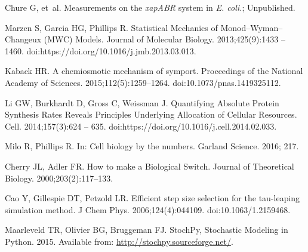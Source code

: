 \documentclass[10pt,letterpaper]{article}
\begin{document}
\begin{thebibliography}{10}
	Chure G, et~al.
	\newblock Measurements on the \emph{xapABR} system in \emph{E. coli.};
	Unpublished.
	
	Marzen S, Garcia HG, Phillips R.
	\newblock Statistical Mechanics of Monod--Wyman--Changeux (MWC) Models.
	\newblock Journal of Molecular Biology. 2013;425(9):1433 -- 1460.
	\newblock doi:{https://doi.org/10.1016/j.jmb.2013.03.013}.
	
	Kaback HR.
	\newblock A chemiosmotic mechanism of symport.
	\newblock Proceedings of the National Academy of Sciences.
	2015;112(5):1259--1264.
	\newblock doi:{10.1073/pnas.1419325112}.
	
	Li GW, Burkhardt D, Gross C, Weissman J.
	\newblock Quantifying Absolute Protein Synthesis Rates Reveals Principles
	Underlying Allocation of Cellular Resources.
	\newblock Cell. 2014;157(3):624 -- 635.
	\newblock doi:{https://doi.org/10.1016/j.cell.2014.02.033}.
	
	Milo R, Phillips R.
	\newblock In: Cell biology by the numbers. Garland Science. 2016; 217.
	
	Cherry JL, Adler FR.
	\newblock How to make a Biological Switch.
	\newblock Journal of Theoretical Biology. 2000;203(2):117--133.
	
	Cao Y, Gillespie DT, Petzold LR.
	\newblock Efficient step size selection for the tau-leaping simulation method.
	\newblock J Chem Phys. 2006;124(4):044109.
	\newblock doi:{10.1063/1.2159468}.
	
	Maarleveld TR, Olivier BG, Bruggeman FJ. StochPy, Stochastic Modeling in
	Python. 2015.
	\newblock Available from: \url{http://stochpy.sourceforge.net/}.
	
\end{thebibliography}


\end{document}
